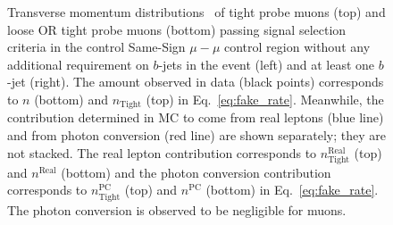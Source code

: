 \begin{figure}[ht!]
{}
\vspace{-10mm}\caption{Transverse momentum distributions \pt\ of tight probe 
muons (top) and loose OR tight probe muons (bottom) passing signal 
selection criteria in the control Same-Sign $\mu-\mu$ control region 
without any additional requirement on $b$-jets in the event (left) and 
at least one $b$-jet (right). 
The amount observed in data (black points) corresponds 
to $n$ (bottom) and $n_{\textrm{Tight}}$ (top) in Eq.~\ref{eq:fake_rate}. 
Meanwhile, the contribution determined in MC to come from 
real leptons (blue line) and from photon conversion (red line) are shown 
separately; they are not stacked. The real lepton contribution corresponds to 
$n_{\textrm{Tight}}^{\textrm{Real}}$ (top) and $n^{\textrm{Real}}$ 
(bottom) and the photon conversion 
contribution 
corresponds to $n_{\textrm{Tight}}^{\textrm{PC}}$ (top) 
and $n^{\textrm{PC}}$ (bottom) in Eq.~\ref{eq:fake_rate}. 
The photon conversion is 
observed to be negligible for muons.  }
\label{fig:fakeEff_CRs_muon}
\end{figure}

